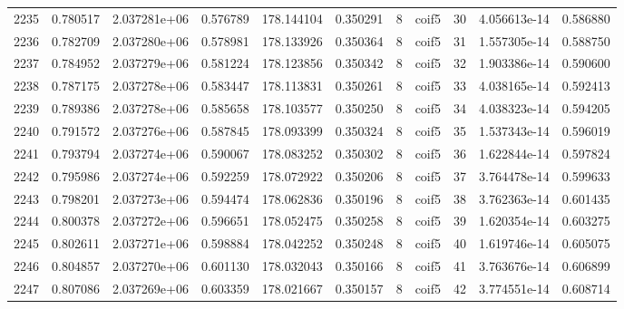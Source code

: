 \begin{tabular}{lrrrrrrlrrr}
2235 &    0.780517 &        2.037281e+06 &  0.576789 &              178.144104 &    0.350291 &       8 &        coif5 &     30 &   4.056613e-14 &      0.586880 \\
2236 &    0.782709 &        2.037280e+06 &  0.578981 &              178.133926 &    0.350364 &       8 &        coif5 &     31 &   1.557305e-14 &      0.588750 \\
2237 &    0.784952 &        2.037279e+06 &  0.581224 &              178.123856 &    0.350342 &       8 &        coif5 &     32 &   1.903386e-14 &      0.590600 \\
2238 &    0.787175 &        2.037278e+06 &  0.583447 &              178.113831 &    0.350261 &       8 &        coif5 &     33 &   4.038165e-14 &      0.592413 \\
2239 &    0.789386 &        2.037278e+06 &  0.585658 &              178.103577 &    0.350250 &       8 &        coif5 &     34 &   4.038323e-14 &      0.594205 \\
2240 &    0.791572 &        2.037276e+06 &  0.587845 &              178.093399 &    0.350324 &       8 &        coif5 &     35 &   1.537343e-14 &      0.596019 \\
2241 &    0.793794 &        2.037274e+06 &  0.590067 &              178.083252 &    0.350302 &       8 &        coif5 &     36 &   1.622844e-14 &      0.597824 \\
2242 &    0.795986 &        2.037274e+06 &  0.592259 &              178.072922 &    0.350206 &       8 &        coif5 &     37 &   3.764478e-14 &      0.599633 \\
2243 &    0.798201 &        2.037273e+06 &  0.594474 &              178.062836 &    0.350196 &       8 &        coif5 &     38 &   3.762363e-14 &      0.601435 \\
2244 &    0.800378 &        2.037272e+06 &  0.596651 &              178.052475 &    0.350258 &       8 &        coif5 &     39 &   1.620354e-14 &      0.603275 \\
2245 &    0.802611 &        2.037271e+06 &  0.598884 &              178.042252 &    0.350248 &       8 &        coif5 &     40 &   1.619746e-14 &      0.605075 \\
2246 &    0.804857 &        2.037270e+06 &  0.601130 &              178.032043 &    0.350166 &       8 &        coif5 &     41 &   3.763676e-14 &      0.606899 \\
2247 &    0.807086 &        2.037269e+06 &  0.603359 &              178.021667 &    0.350157 &       8 &        coif5 &     42 &   3.774551e-14 &      0.608714 \\

\end{tabular}
